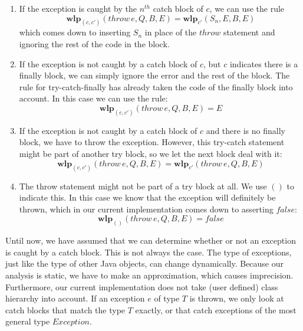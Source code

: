 \documentclass[a4paper, fleqn]{article}
\newcommand{\wlp}{\textbf{wlp}\xspace}
\begin{document}
\begin{enumerate}
\item If the exception is caught by the $n^{th}$ catch block of $c$, we can use the rule \[\wlp_{(c, c')}(throw\, e, Q, B, E) = \wlp_{c'}(S_n, E, B, E)\] which comes down to inserting $S_n$ in place of the $throw$ statement and ignoring the rest of the code in the block.
\item If the exception is not caught by a catch block of $c$, but $c$ indicates there is a finally block, we can simply ignore the error and the rest of the block. The rule for try-catch-finally has already taken the code of the finally block into account. In this case we can use the rule: \[\wlp_{(c, c')}(throw\, e, Q, B, E) = E\]
\item  If the exception is not caught by a catch block of $c$ and there is no finally block, we have to throw the exception. However, this try-catch statement might be part of another try block, so we let the next block deal with it: \[\wlp_{(c, c')}(throw\, e, Q, B, E) = \wlp_{c'}(throw\, e, Q, B, E)\]
\item The throw statement might not be part of a try block at all. We use $()$ to indicate this. In this case we know that the exception will definitely be thrown, which in our current implementation comes down to asserting $false$: \[\wlp_{()}(throw\, e, Q, B, E) = false\]
\end{enumerate}

Until now, we have assumed that we can determine whether or not an exception is caught by a catch block. This is not always the case. The type of exceptions, just like the type of other Java objects, can change dynamically. Because our analysis is static, we have to make an approximation, which causes imprecision. Furthermore, our current implementation does not take (user defined) class hierarchy into account. If an exception $e$ of type $T$ is thrown, we only look at catch blocks that match the type $T$ exactly, or that catch exceptions of the most general type $Exception$.
\end{document}
